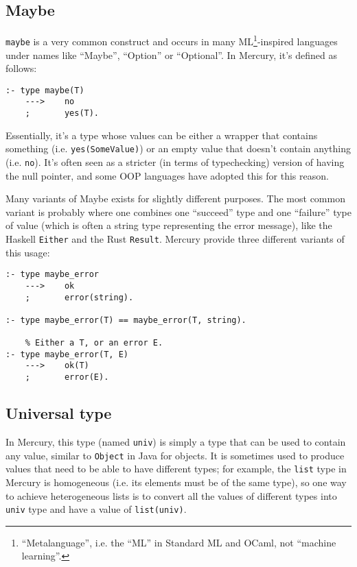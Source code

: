 \subsection{Maybe}

\texttt{maybe} is a very common construct and occurs in many ML\footnote{``Metalanguage'', i.e. the ``ML'' in Standard ML and OCaml, not ``machine learning''.}-inspired languages under names like ``Maybe'', ``Option'' or ``Optional''. In Mercury, it's defined as follows:

\begin{lstlisting}[language=Mercury]
:- type maybe(T)
    --->    no
    ;       yes(T).
\end{lstlisting}

Essentially, it's a type whose values can be either a wrapper that contains something (i.e. \texttt{yes(SomeValue)}) or an empty value that doesn't contain anything (i.e. \texttt{no}). It's often seen as a stricter (in terms of typechecking) version of having the null pointer, and some OOP languages have adopted this for this reason. 

Many variants of Maybe exists for slightly different purposes. The most common variant is probably where one combines one ``succeed'' type and one ``failure'' type of value (which is often a string type representing the error message), like the Haskell \texttt{Either} and the Rust \texttt{Result}. Mercury provide three different variants of this usage:

\begin{lstlisting}[language=Mercury]
:- type maybe_error
    --->    ok
    ;       error(string).

:- type maybe_error(T) == maybe_error(T, string).

    % Either a T, or an error E.
:- type maybe_error(T, E)
    --->    ok(T)
    ;       error(E).
\end{lstlisting}

\subsection{Universal type}

In Mercury, this type (named \texttt{univ}) is simply a type that can be used to contain any value, similar to \texttt{Object} in Java for objects. It is sometimes used to produce values that need to be able to have different types; for example, the \texttt{list} type in Mercury is homogeneous (i.e. its elements must be of the same type), so one way to achieve heterogeneous lists is to convert all the values of different types into \texttt{univ} type and have a value of \texttt{list(univ)}.

